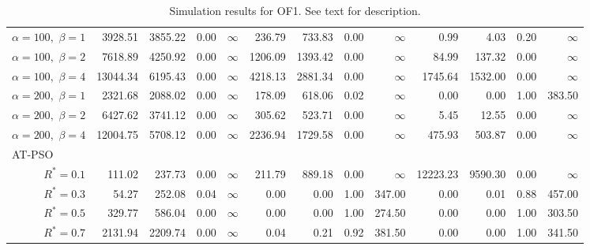 \documentclass[12pt]{article}
\begin{document}
\begin{table}[ht]
{\begin{tabular}{r|rrrr|rrrr|rrrr}
  $\alpha = 100,$ $\beta =1$ & 3928.51 & 3855.22 & 0.00 & $\infty$ & 236.79 & 733.83 & 0.00 & $\infty$ & 0.99 & 4.03 & 0.20 & $\infty$ \\ 
  $\alpha = 100,$ $\beta =2$ & 7618.89 & 4250.92 & 0.00 & $\infty$ & 1206.09 & 1393.42 & 0.00 & $\infty$ & 84.99 & 137.32 & 0.00 & $\infty$ \\ 
  $\alpha = 100,$ $\beta =4$ & 13044.34 & 6195.43 & 0.00 & $\infty$ & 4218.13 & 2881.34 & 0.00 & $\infty$ & 1745.64 & 1532.00 & 0.00 & $\infty$ \\ 
  $\alpha = 200,$ $\beta =1$ & 2321.68 & 2088.02 & 0.00 & $\infty$ & 178.09 & 618.06 & 0.02 & $\infty$ & 0.00 & 0.00 & 1.00 & 383.50 \\ 
  $\alpha = 200,$ $\beta =2$ & 6427.62 & 3741.12 & 0.00 & $\infty$ & 305.62 & 523.71 & 0.00 & $\infty$ & 5.45 & 12.55 & 0.00 & $\infty$ \\ 
  $\alpha = 200,$ $\beta =4$ & 12004.75 & 5708.12 & 0.00 & $\infty$ & 2236.94 & 1729.58 & 0.00 & $\infty$ & 475.93 & 503.87 & 0.00 & $\infty$ \\ 
\hline
\multicolumn{1}{l|}{AT-PSO} &&&&&&&&&&&&\\
  $R^* = 0.1$ & 111.02 & 237.73 & 0.00 & $\infty$ & 211.79 & 889.18 & 0.00 & $\infty$ & 12223.23 & 9590.30 & 0.00 & $\infty$ \\ 
  $R^* = 0.3$ & 54.27 & 252.08 & 0.04 & $\infty$ & 0.00 & 0.00 & 1.00 & 347.00 & 0.00 & 0.01 & 0.88 & 457.00 \\ 
  $R^* = 0.5$ & 329.77 & 586.04 & 0.00 & $\infty$ & 0.00 & 0.00 & 1.00 & 274.50 & 0.00 & 0.00 & 1.00 & 303.50 \\ 
  $R^* = 0.7$ & 2131.94 & 2209.74 & 0.00 & $\infty$ & 0.04 & 0.21 & 0.92 & 381.50 & 0.00 & 0.00 & 1.00 & 341.50 \\ 
   \hline
\end{tabular}
}
\caption{Simulation results for OF1. See text for description.}
\label{tab:psosim1}
\end{table}
\end{document}

